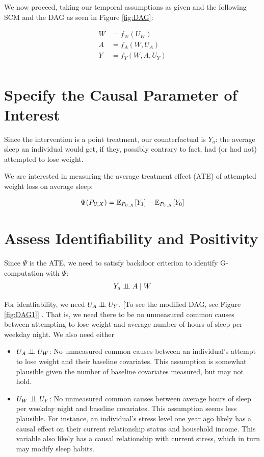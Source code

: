 \documentclass{article}
\begin{document}
We now proceed, taking our temporal assumptions as given and the following SCM and the DAG as seen in Figure \ref{fig:DAG}:

\begin{align*}
W &= f_{W}(U_{W}) \\
A &= f_{A}(W,U_{A}) \\
Y &= f_{Y}(W,A,U_{Y}) \\
\end{align*}


\section{Specify the Causal Parameter of Interest}

Since the intervention is a point treatment, our counterfactual is $Y_{a}$: the average sleep an individual would get, if they, possibly contrary to fact, had (or had not) attempted to lose weight.

We are interested in measuring the average treatment effect (ATE) of attempted weight loss on average sleep:

$$\Psi(P_{U,X}) = \mathbb{E}_{P_{U,X}}[Y_1] - \mathbb{E}_{P_{U,X}}[Y_0]$$

\section{Assess Identifiability and Positivity}
\label{sec:assumptions}

Since $\Psi$ is the ATE, we need to satisfy backdoor criterion to identify G-computation with $\Psi$:
   $$Y_{a} \perp\hspace{-5pt}\perp A \mid W$$

For identfiability, we need $U_{A} \perp\hspace{-5pt}\perp U_{Y}$. [To see the modified DAG, see Figure \ref{fig:DAG1}] .  That is, we need there to be no unmeasured common causes between attempting to lose weight and average number of hours of sleep per weekday night. We also need either 
    \begin{itemize}
      \item $U_{A} \perp\hspace{-5pt}\perp U_{W}$: No unmeasured common causes between an individual's attempt to lose weight and their baseline covariates. This assumption is somewhat plausible given the number of baseline covariates measured, but may not hold.
      \item $U_{W} \perp\hspace{-5pt}\perp U_{Y}$: No unmeasured common causes between average hours of sleep per weekday night and baseline covariates. This assumption seems less plausible. For instance, an individual's stress level one year ago likely has a causal effect on their current relationship status and household income. This variable also likely has a causal relationship with current stress, which in turn may modify sleep habits.
    \end{itemize}
\end{document}
